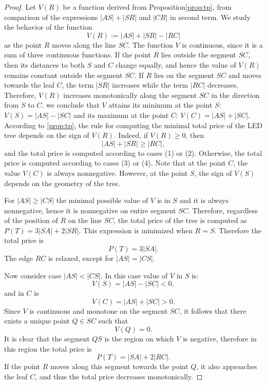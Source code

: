 \documentclass[openany]{book}
\newcommand{\Ptotal}[1]{P(#1)}
\begin{document}
	\begin{proof}
		Let \(V(R)\) be a function derived from Proposition\ref{prop:tp}, from comparison of the expressions \(|AS|+|SR|\) and \(|CR|\) in second term. 
		We study the behavior of the function
		\[
		V(R) := |AS| + |SR| - |RC|
		\]
		as the point \(R\) moves along the line \(SC\).
		The function \(V\) is continuous, since it is a sum of three continuous
		functions. If the point \(R\) lies outside the segment \(SC\), then its
		distances to both \(S\) and \(C\) change equally, and hence the value
		of \(V(R)\) remains constant outside the segment \(SC\).
		If \(R\) lies on the segment \(SC\) and moves towards the leaf \(C\),
		the term \(|SR|\) increases while the term \(|RC|\) decreases. Therefore,
		\(V(R)\) increases monotonically along the segment \(SC\) in the direction
		from \(S\) to \(C\).
		we conclude that \(V\) attains its
		minimum at the point \(S\): \(V(S) = |AS| - |SC|\) and its maximum at the point \(C\): \(V(C) = |AS| + |SC|\).
		According to \cref{prop:tp}, the rule for computing the minimal
		total price of the LED tree depends on the sign of \(V(R)\).
		Indeed, if \(V(R) \geq 0\), then
		\[
		|AS| + |SR| \geq |RC|,
		\]
		and the total price is computed according to cases (1) or (2).
		Otherwise, the total price is computed according to cases (3) or (4).
		Note that at the point \(C\), the value \(V(C)\) is always nonnegative.
		However, at the point \(S\), the sign of \(V(S)\) depends on the geometry
		of the tree.
		
		For \(|AS| \geq |CS|\) the minimal possible value of \(V\) is in \(S\) and it is always nonnegative, hence it is nonnegative on entire segment \(SC\).
		Therefore, regardless of the position of \(R\) on the line \(SC\), the total
		price of the tree is computed as \(\Ptotal{T} = 3|SA| + 2|SR|\). This expression is minimized when \(R=S\). Therefore the total price is
		\[
		\Ptotal{T} = 3|SA|.
		\]
		The edge \(RC\) is relaxed, except for \(|AS| = |CS|\). 
		
		Now consider case \(|AS| < |CS|\). In this case value of \(V\) in \(S\) is:
		\[
		V(S)=|AS|-|SC|<0,
		\] and in \(C\) is \[
		V(C)=|AS|+|SC|>0.
		\] 
		Since \(V\) is continuous and monotone on the segment \(SC\), it follows that there exists a unique point \(Q\in SC\) such that
		\[
		V(Q)=0.
		\]
		It is clear that the segment \(QS\) is the region on which \(V\) is negative, therefore in this region the total price is 
		\[
		\Ptotal{T} = |SA| + 2|RC|.
		\]
		If the point \(R\) moves along this segment towards the point \(Q\), it also
		approaches the leaf \(C\), and thus	the total price decreases monotonically.
		

\end{proof}
\end{document}
